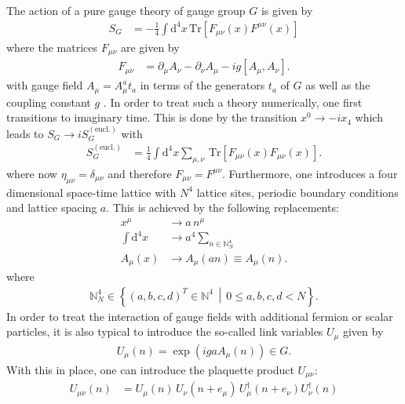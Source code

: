 The action of a pure gauge theory of gauge group $G$ is given by
\begin{align*}
 S_G & = -\frac{1}{4} \int \mathrm{d}^4 x \, \mathrm{Tr} \left[ F_{\mu \nu} (x) F^{\mu \nu} (x) \right]
\end{align*}
where the matrices $F_{\mu \nu}$ are given by
\begin{align*}
 F_{\mu \nu} & =  \partial_\mu A_\nu - \partial_\nu A_\mu  -  i g [A_\mu, A_\nu] \textrm{.}
\end{align*}
with gauge field $A_\mu = A_\mu^a t_a$ in terms of the generators $t_a$ of $G$ as well as the coupling constant $g$ \cite{Peskin:1995}. In order to treat such a theory numerically, one first transitions to imaginary time. This is done by the transition $x^0 \rightarrow -i x_4$ which leads to $S_G \rightarrow i S_G^{(\textrm{eucl.})}$ with
\begin{align*}
 S_G^{(\textrm{eucl.})} & = \frac{1}{4} \int \mathrm{d}^4 x  \sum_{\mu,\nu}  \, \mathrm{Tr} \left[ F_{\mu \nu} (x) F_{\mu \nu} (x) \right] \textrm{.}
\end{align*}
where now $\eta_{\mu \nu} = \delta_{\mu \nu}$ and therefore $F_{\mu \nu} = F^{\mu \nu}$. Furthermore, one introduces a four dimensional space-time lattice  with $N^4$ lattice sites, periodic boundary conditions and lattice spacing $a$. This is achieved by the following replacements:
\begin{align*}
 x^\mu               & \rightarrow a \, n^\mu                           \\
 \int \mathrm{d}^4 x & \rightarrow a^4 \sum_{n \in \mathbb{N}^4_N}        \\
 A_\mu (x)           & \rightarrow A_\mu(an) \equiv A_\mu(n) \textrm{.}
\end{align*}
where
\begin{align*}
 \mathbb{N}^4_N \in \left\{ (a,b,c,d)^T \in \mathbb{N}^4 \, \middle| \, 0 \le a,b,c,d < N \right\} \textrm{.}
\end{align*}
In order to treat the interaction of gauge fields with additional fermion or scalar particles, it is also typical to introduce the so-called link variables $U_\mu$ given by
\begin{align*}
 U_\mu(n) = \exp \left( i g a A_\mu(n) \right) \in G \textrm{.}
\end{align*}
With this in place, one can introduce the plaquette product $U_{\mu \nu}$:
\begin{align*}
 U_{\mu \nu}(n) & = U_\mu(n) \, U_\nu(n+e_\mu) \, U^\dagger_\mu (n + e_\nu) U^\dagger_\nu(n)
\end{align*}
